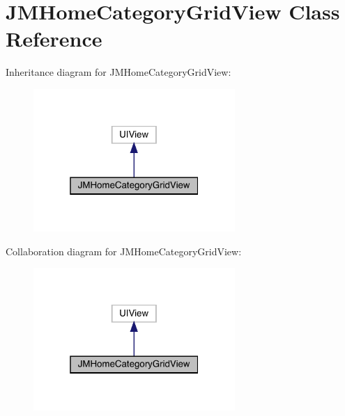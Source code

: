 \hypertarget{interface_j_m_home_category_grid_view}{}\section{J\+M\+Home\+Category\+Grid\+View Class Reference}
\label{interface_j_m_home_category_grid_view}


Inheritance diagram for J\+M\+Home\+Category\+Grid\+View\+:\nopagebreak
\begin{figure}[H]
\begin{center}
\leavevmode
\includegraphics[width=217pt]{interface_j_m_home_category_grid_view__inherit__graph}
\end{center}
\end{figure}


Collaboration diagram for J\+M\+Home\+Category\+Grid\+View\+:\nopagebreak
\begin{figure}[H]
\begin{center}
\leavevmode
\includegraphics[width=217pt]{interface_j_m_home_category_grid_view__coll__graph}
\end{center}
\end{figure}
